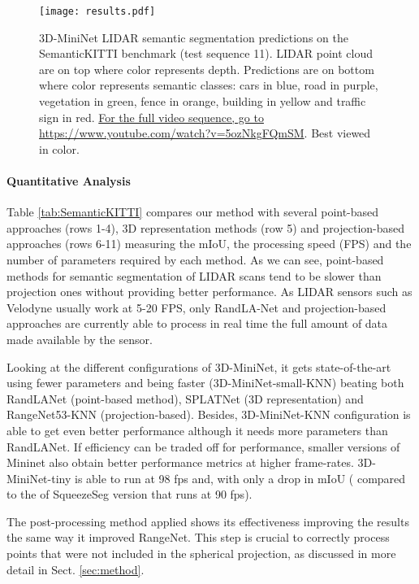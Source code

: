 \documentclass[letterpaper, 10 pt, journal, twoside]{IEEEtran}
\begin{document}
\begin{figure*}[!tb]
\centering
\texttt{[image: results.pdf]}
\caption{3D-MiniNet LIDAR semantic segmentation predictions on the SemanticKITTI   benchmark (test sequence 11). LIDAR point cloud are on top  where color represents depth. Predictions are on bottom where color represents semantic classes: cars in blue, road in purple, vegetation in green, fence in orange, building in yellow and traffic sign in red. \href{https://www.youtube.com/watch?v=5ozNkgFQmSM}{For the full video sequence, go to https://www.youtube.com/watch?v=5ozNkgFQmSM}.
Best viewed in color. }
\label{fig:results}
\end{figure*} 

\paragraph{Quantitative Analysis} 
Table \ref{tab:SemanticKITTI} compares our method with several point-based approaches (rows 1-4), 3D representation methods (row 5) and projection-based approaches (rows 6-11) measuring the mIoU, the processing speed (FPS) and the number of parameters required by each method. 
As we can see, point-based methods for semantic segmentation of LIDAR scans tend to be slower than projection ones without providing better performance. As LIDAR sensors such as Velodyne usually work at 5-20 FPS, only RandLA-Net and projection-based approaches are currently able to process in real time the full amount of data made available by the sensor.

Looking at the different configurations of 3D-MiniNet, it gets state-of-the-art using fewer parameters and being faster (3D-MiniNet-small-KNN) beating both RandLANet (point-based method), SPLATNet (3D representation) and RangeNet53-KNN (projection-based). Besides, 3D-MiniNet-KNN configuration is able to get even better performance although it needs more parameters than RandLANet.
If efficiency can be traded off for performance, smaller versions of Mininet also obtain better performance metrics at higher frame-rates. 3D-MiniNet-tiny is able to run at 98 fps and, with only a  drop in mIoU ( compared to the  of SqueezeSeg version that runs at 90 fps).


The post-processing method applied \cite{milioto2019rangenet++} shows its effectiveness improving the results the same way it improved RangeNet. 
This step is crucial to correctly process points that were not included in the spherical projection, as discussed in more detail in Sect. \ref{sec:method}. 
\end{document}
